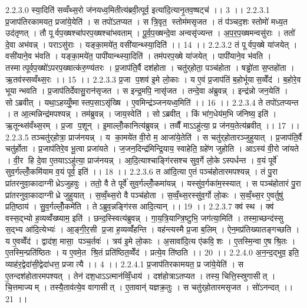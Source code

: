 2.2.3.0
स्या॒दिति॑ सव्वँथ्स॒रो ज॑नयध्व॒मितीत्य॑ब्रवी॒त्पूर्व॒ इत्या॑दि॒त्यानृ॒तव॒ष्षट्च॑ ।। 3 ।।
2.2.3.1
प्र॒जाप॑तिरकामयत॒ प्रजा॑ये॒येति॑ । स तपो॑ऽतप्यत । स त्रि॒वृत॒॒ स्तोम॑मसृजत । तं प॑ञ्चद॒शः स्तोमो॑ मध्य॒त उद॑तृणत् । तौ पूर्वप॒ख्षश्चा॑परप॒ख्षश्चा॑भवताम् । पू॒र्व॒प॒ख्षन्दे॒वा अन्वसृ॑ज्यन्त । अ॒प॒र॒प॒ख्षमन्वसु॑राः । ततो॑ दे॒वा अभ॑वन्न् । पराऽसु॑राः । यङ्का॒मये॑त॒ वसी॑यान्थ्स्या॒दिति॑ ।। 14 ।।
2.2.3.2
तं पूर्वप॒ख्षे या॑जयेत् । वसी॑याने॒व भ॑वति । यङ्का॒मये॑त॒ पापी॑यान्थ्स्या॒दिति॑ । तम॑परप॒ख्षे या॑जयेत् । पापी॑याने॒व भ॑वति । तस्मात्पूर्वप॒ख्षो॑ऽपरप॒ख्षात्क॑रु॒ण्य॑तरः । प्र॒जाप॑ति॒र्वै दश॑होता । चतु॑र्‌होता॒ पञ्च॑होता । षड्ढो॑ता स॒प्तहो॑ता । ऋ॒तव॑स्सव्वँथ्स॒रः ।। 15 ।।
2.2.3.3
प्र॒जा प॒शव॑ इ॒मे लो॒काः । य ए॒वं प्र॒जाप॑तिं ब॒होर्भूया॑स॒व्वेँद॑ । ब॒होरे॒व भूयान्भवति । प्र॒जाप॑तिर्देवासु॒रान॑सृजत । स इन्द्र॒मपि॒ नासृ॑जत । तन्दे॒वा अ॑ब्रुवन्न् । इन्द्र॑न्नो जन॒येति॑ । सोऽब्रवीत् । यथा॒ऽहय्युँ॒ष्मास्तप॒साऽसृ॑ख्षि । ए॒वमिन्द्र॑ञ्जनयध्व॒मिति॑ ।। 16 ।।
2.2.3.4
ते तपो॑ऽतप्यन्त । त आ॒त्मन्निन्द्र॑मपश्यन्न् । तम॑ब्रुवन्न् । जाय॒स्वेति॑ । सोऽब्रवीत् । किं भा॑ग॒धेय॑म॒भि ज॑निष्य॒ इति॑ । ऋ॒तून्थ्स॑वँथ्स॒रम् । प्र॒जा प॒शून् । इ॒माल्लोँ॒कानित्य॑ब्रुवन्न् । तव्वैँ माऽऽहु॑त्या॒ प्र ज॑नय॒तेत्य॑ब्रवीत् ।। 17 ।।
2.2.3.5
तञ्चतु॑र्‌होत्रा॒ प्राज॑नयन्न् । य का॒मये॑त वी॒रो म॒ आजा॑ये॒तेति॑ । स चतु॑र्‌होतारञ्जुहुयात् । प्र॒जाप॑ति॒र्वै चतु॑र्होता । प्र॒जाप॑तिरे॒व भू॒त्वा प्रजा॑यते । ज॒जन॒दिन्द्र॑मिन्द्रि॒याय॒ स्वाहेति॒ ग्रहे॑ण जुहोति । आऽस्य॑ वी॒रो जा॑यते । वी॒र हि दे॒वा ए॒तयाऽऽहु॑त्या॒ प्राज॑नयन्न् । आ॒दि॒त्याश्चाङ्गि॑रसश्च सुव॒र्गे लो॒केऽस्पर्धन्त । व॒यं पूर्वे॑ सुव॒र्गल्लोँ॒कमि॑याम व॒यं पूर्व॒ इति॑ ।। 18 ।।
2.2.3.6
त आ॑दि॒त्या ए॒तं पञ्च॑होतारमपश्यन्न् । तं पु॒रा प्रा॑तरनुवा॒कादाग्नीध्रेऽजुहवुः । ततो॒ वै ते पूर्वे॑ सुव॒र्गल्लोँ॒कमा॑यन्न् । यस्सु॑व॒र्गका॑म॒स्स्यात् । स पञ्च॑होतारं पु॒रा प्रा॑तरनुवा॒कादाग्नीध्रे जुहुयात् । स॒व्वँ॒थ्स॒रो वै पञ्च॑होता । स॒व्वँ॒थ्स॒रस्सु॑व॒र्गो लो॒कः । स॒व्वँ॒थ्स॒र ए॒वर्तुषु॑ प्रति॒ष्ठाय॑ । सु॒व॒र्गल्लोँ॒कमे॑ति । तेऽब्रुव॒न्नङ्गि॑रस आदि॒त्यान् ।। 19 ।।
2.2.3.7
क्व॑ स्थ । क्व॑ वस्स॒द्भ्यो ह॒व्यव्वँ॑ख्ष्याम॒ इति॑ । छन्द॒स्स्वित्य॑ब्रुवन्न् । गा॒य॒त्रि॒यान्त्रि॒ष्टुभि॒ जग॑त्या॒मिति॑ । तस्मा॒च्छन्द॑स्सु स॒द्भ्य आ॑दि॒त्येभ्यः॑ । आ॒ङ्गी॒र॒सी प्र॒जा ह॒व्यव्वँ॑हन्ति । वह॑न्त्यस्मै प्र॒जा ब॒लिम् । ऐन॒मप्र॑तिख्यातङ्गच्छति । य ए॒वव्वेँद॑ । द्वाद॑श॒ मासा॒ पञ्च॒र्तवः॑ । त्रय॑ इ॒मे लो॒काः । अ॒सावा॑दि॒त्य ए॑कवि॒॒शः । ए॒तस्मि॒न्वा ए॒ष श्रि॒तः । ए॒तस्मि॒न्प्रति॑ष्ठितः । य ए॒वमे॒त श्रि॒तं प्रति॑ष्ठित॒व्वेँद॑ । प्रत्ये॒व ति॑ष्ठति ।। 20 ।।
2.2.4.0
अ॒न॒न्द॒द्भुव॒ इति॒ व्याह॑र॒द्वेदा॑सी॒द्वेदा॑धत्त॒ प्रजात्यै ।। 4 ।।
2.2.4.1
प्र॒जाप॑तिरकामयत॒ प्र जा॑ये॒येति॑ । स ए॒तन्दश॑होतारमपश्यत् । तेन॑ दश॒धाऽऽत्मान॑व्विँ॒धाय॑ । दश॑होत्राऽतप्यत । तस्य॒ चित्ति॒स्स्रुगासीत् । चि॒त्तमाज्यम् । तस्यै॒ताव॑त्ये॒व वागासीत् । ए॒तावान्॑ यज्ञक्र॒तुः । स चतु॑र्‌होतारमसृजत । सो॑ऽनन्दत् ।। 21 ।।

